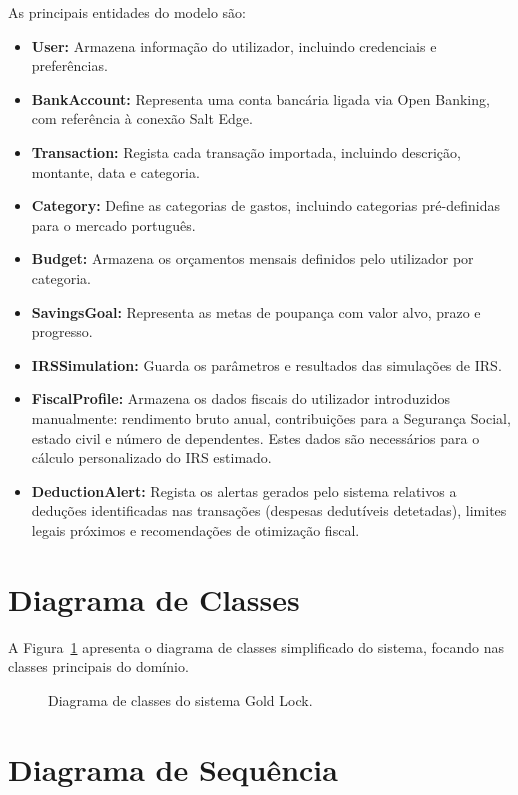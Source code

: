 As principais entidades do modelo são:

\begin{itemize}
    \item \textbf{User:} Armazena informação do utilizador, incluindo credenciais e preferências.
    \item \textbf{BankAccount:} Representa uma conta bancária ligada via Open Banking, com referência à conexão Salt Edge.
    \item \textbf{Transaction:} Regista cada transação importada, incluindo descrição, montante, data e categoria.
    \item \textbf{Category:} Define as categorias de gastos, incluindo categorias pré-definidas para o mercado português.
    \item \textbf{Budget:} Armazena os orçamentos mensais definidos pelo utilizador por categoria.
    \item \textbf{SavingsGoal:} Representa as metas de poupança com valor alvo, prazo e progresso.
    \item \textbf{IRSSimulation:} Guarda os parâmetros e resultados das simulações de \ac{IRS}.
    \item \textbf{FiscalProfile:} Armazena os dados fiscais do utilizador introduzidos manualmente: rendimento bruto anual, contribuições para a Segurança Social, estado civil e número de dependentes. Estes dados são necessários para o cálculo personalizado do \ac{IRS} estimado.
    \item \textbf{DeductionAlert:} Regista os alertas gerados pelo sistema relativos a deduções identificadas nas transações (despesas dedutíveis detetadas), limites legais próximos e recomendações de otimização fiscal.
\end{itemize}


\section{Diagrama de Classes}
\label{sec:arq-classes}

A Figura~\ref{fig:diagrama-classes} apresenta o diagrama de classes simplificado do sistema, focando nas classes principais do domínio.

\begin{figure}[H]
\centering

\caption{Diagrama de classes do sistema Gold Lock.}
\label{fig:diagrama-classes}
\end{figure}


\section{Diagrama de Sequência}
\label{sec:arq-sequencia}

